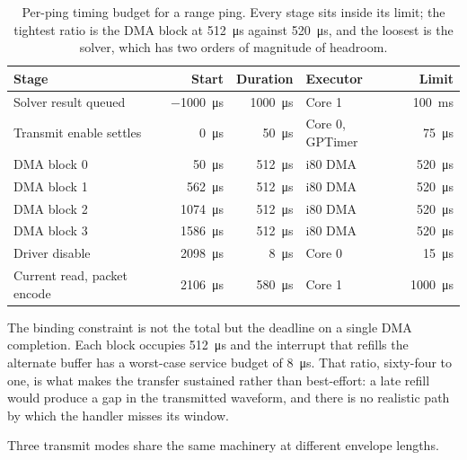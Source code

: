 \documentclass[11pt,a4paper]{article}
\begin{document}
\begin{table}[htbp]
\centering
\small
\begin{tabular}{lrrlr}
\toprule
\textbf{Stage} & \textbf{Start} & \textbf{Duration} & \textbf{Executor} & \textbf{Limit} \\
\midrule
Solver result queued & \SI{-1000}{\micro\second} & \SI{1000}{\micro\second} & Core 1 & \SI{100}{\milli\second} \\
Transmit enable settles & \SI{0}{\micro\second} & \SI{50}{\micro\second} & Core 0, GPTimer & \SI{75}{\micro\second} \\
DMA block 0 & \SI{50}{\micro\second} & \SI{512}{\micro\second} & i80 DMA & \SI{520}{\micro\second} \\
DMA block 1 & \SI{562}{\micro\second} & \SI{512}{\micro\second} & i80 DMA & \SI{520}{\micro\second} \\
DMA block 2 & \SI{1074}{\micro\second} & \SI{512}{\micro\second} & i80 DMA & \SI{520}{\micro\second} \\
DMA block 3 & \SI{1586}{\micro\second} & \SI{512}{\micro\second} & i80 DMA & \SI{520}{\micro\second} \\
Driver disable & \SI{2098}{\micro\second} & \SI{8}{\micro\second} & Core 0 & \SI{15}{\micro\second} \\
Current read, packet encode & \SI{2106}{\micro\second} & \SI{580}{\micro\second} & Core 1 & \SI{1000}{\micro\second} \\
\bottomrule
\end{tabular}
\caption{Per-ping timing budget for a range ping. Every stage sits inside its
limit; the tightest ratio is the DMA block at \SI{512}{\micro\second} against
\SI{520}{\micro\second}, and the loosest is the solver, which has two orders of
magnitude of headroom.}
\label{tab:timing}
\end{table}

The binding constraint is not the total but the deadline on a single DMA
completion. Each block occupies \SI{512}{\micro\second} and the interrupt that
refills the alternate buffer has a worst-case service budget of
\SI{8}{\micro\second}. That ratio, sixty-four to one, is what makes the transfer
sustained rather than best-effort: a late refill would produce a gap in the
transmitted waveform, and there is no realistic path by which the handler misses
its window.

Three transmit modes share the same machinery at different envelope lengths.
\end{document}
